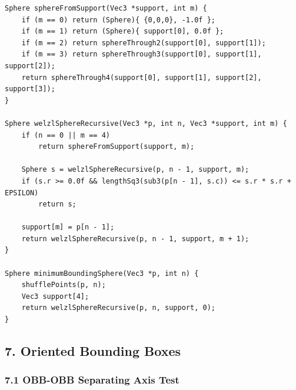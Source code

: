 \documentclass[10pt,letterpaper]{article}
\begin{document}
\begin{verbatim}
Sphere sphereFromSupport(Vec3 *support, int m) {
    if (m == 0) return (Sphere){ {0,0,0}, -1.0f };
    if (m == 1) return (Sphere){ support[0], 0.0f };
    if (m == 2) return sphereThrough2(support[0], support[1]);
    if (m == 3) return sphereThrough3(support[0], support[1], support[2]);
    return sphereThrough4(support[0], support[1], support[2], support[3]);
}

Sphere welzlSphereRecursive(Vec3 *p, int n, Vec3 *support, int m) {
    if (n == 0 || m == 4)
        return sphereFromSupport(support, m);

    Sphere s = welzlSphereRecursive(p, n - 1, support, m);
    if (s.r >= 0.0f && lengthSq3(sub3(p[n - 1], s.c)) <= s.r * s.r + EPSILON)
        return s;

    support[m] = p[n - 1];
    return welzlSphereRecursive(p, n - 1, support, m + 1);
}

Sphere minimumBoundingSphere(Vec3 *p, int n) {
    shufflePoints(p, n);
    Vec3 support[4];
    return welzlSphereRecursive(p, n, support, 0);
}
\end{verbatim}


\subsection*{7. Oriented Bounding Boxes}


\subsubsection*{7.1 OBB-OBB Separating Axis Test}
\end{document}
